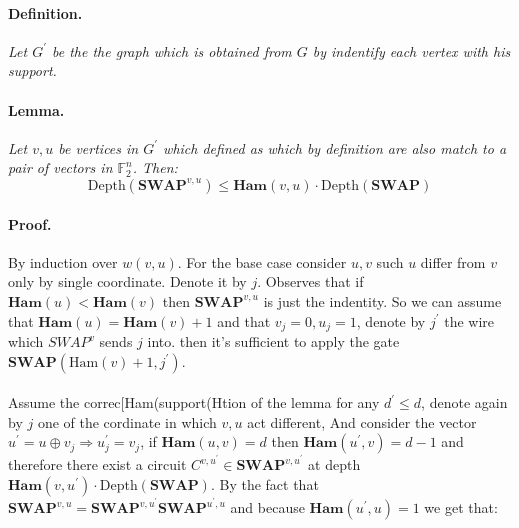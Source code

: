 \documentclass{article}
\begin{document}
\begin{multicols*}{2}
\paragraph{Definition.} \textit{ Let $G^\prime$ be the the graph which is obtained from $G$ by indentify each vertex with his support. }
\paragraph{Lemma.} \textit{ Let \(v,u\) be vertices in \(G^{\prime}\) which defined as   which by definition are also match to a pair of vectors in \(\mathbb{F}_2^{n} \). Then:} 
\begin{equation*}
  \text{Depth}\left(\textbf{SWAP}^{v,u}\right) \le \textbf{Ham}(v,u)\cdot \text{Depth}\left(\textbf{SWAP}\right)
\end{equation*}

\paragraph{Proof.} By induction over \(w(v,u)\). For the base case consider \(u,v\) such \(u\) differ from \(v\) only by single coordinate. Denote it by \(j\). Observes that if $\textbf{Ham}(u) <\textbf{Ham}(v)$ then $\textbf{SWAP}^{v,u}$ is just the indentity. So we can assume that $ \textbf{Ham}(u) = \textbf{Ham}(v)+1 $ and that  \(v_j = 0, u_j =1\), denote by \(j^{\prime}\) the wire which \(SWAP^{v}\) sends \(j\) into. then it's sufficient to apply the gate \(\textbf{SWAP}(\text{Ham}(v) +1, j^\prime) \).


\paragraph{}
Assume the correc[Ham(support(Htion of the lemma for any \(d^\prime \le d\), denote again by $j$ one of the cordinate in which $v,u$ act different, And consider the vector \(u^\prime = u \oplus v_{j} \Rightarrow u^{\prime}_{j} = v_{j}\), if \( \textbf{Ham}(u,v) = d\) then \( \textbf{Ham}(u^\prime,v) = d-1\) and therefore there exist a circuit \(C^{v,u^\prime}\in \textbf{SWAP}^{v,u^\prime}\) at depth \( \textbf{Ham}(v,u^\prime)\cdot\text{Depth}\left(\textbf{SWAP}\right) \). By the fact that \( \textbf{SWAP}^{v,u} = \textbf{SWAP}^{v,u^\prime} \textbf{SWAP}^{u^\prime,u}     \) and because \( \textbf{Ham}(u^\prime,u) = 1 \) we get that:


\end{multicols*}
\end{document}
